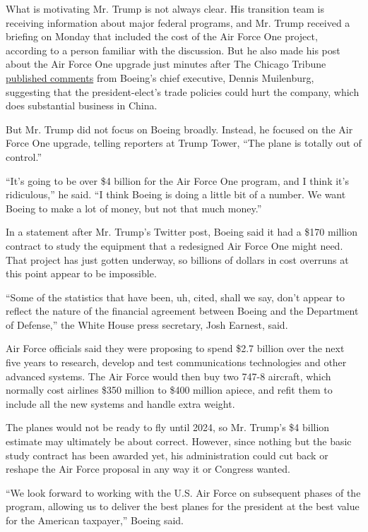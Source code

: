 What is motivating Mr. Trump is not always clear. His transition team is
receiving information about major federal programs, and Mr. Trump
received a briefing on Monday that included the cost of the Air Force
One project, according to a person familiar with the discussion. But he
also made his post about the Air Force One upgrade just minutes after
The Chicago Tribune
\href{http://www.chicagotribune.com/business/columnists/ct-boeing-china-trump-robert-reed-1206-biz-20161205-column.html}{published
comments} from Boeing's chief executive, Dennis Muilenburg, suggesting
that the president-elect's trade policies could hurt the company, which
does substantial business in China.

But Mr. Trump did not focus on Boeing broadly. Instead, he focused on
the Air Force One upgrade, telling reporters at Trump Tower, ``The plane
is totally out of control.''

``It's going to be over \$4 billion for the Air Force One program, and I
think it's ridiculous,'' he said. ``I think Boeing is doing a little bit
of a number. We want Boeing to make a lot of money, but not that much
money.''

In a statement after Mr. Trump's Twitter post, Boeing said it had a
\$170 million contract to study the equipment that a redesigned Air
Force One might need. That project has just gotten underway, so billions
of dollars in cost overruns at this point appear to be impossible.

``Some of the statistics that have been, uh, cited, shall we say, don't
appear to reflect the nature of the financial agreement between Boeing
and the Department of Defense,'' the White House press secretary, Josh
Earnest, said.

Air Force officials said they were proposing to spend \$2.7 billion over
the next five years to research, develop and test communications
technologies and other advanced systems. The Air Force would then buy
two 747-8 aircraft, which normally cost airlines \$350 million to \$400
million apiece, and refit them to include all the new systems and handle
extra weight.

The planes would not be ready to fly until 2024, so Mr. Trump's \$4
billion estimate may ultimately be about correct. However, since nothing
but the basic study contract has been awarded yet, his administration
could cut back or reshape the Air Force proposal in any way it or
Congress wanted.

``We look forward to working with the U.S. Air Force on subsequent
phases of the program, allowing us to deliver the best planes for the
president at the best value for the American taxpayer,'' Boeing said.

